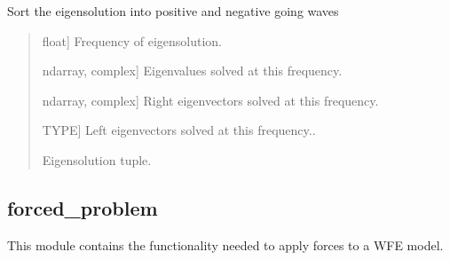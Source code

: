 \documentclass[letterpaper,10pt,english]{sphinxmanual}
\begin{document}
\begin{fulllineitems}
\label{\detokenize{core:pywfe.core.classify_modes.sort_eigensolution}}
\pysigstartsignatures
{}
\pysigstopsignatures
\sphinxAtStartPar
Sort the eigensolution into positive and negative going waves
\begin{quote}\begin{description}
\begin{description}
\sphinxlineitem{\sphinxstylestrong{f}}{[}float{]}
\sphinxAtStartPar
Frequency of eigensolution.

\sphinxlineitem{\sphinxstylestrong{eigenvalues}}{[}ndarray, complex{]}
\sphinxAtStartPar
Eigenvalues solved at this frequency.

\sphinxlineitem{\sphinxstylestrong{right\_eigenvectors}}{[}ndarray, complex{]}
\sphinxAtStartPar
Right eigenvectors solved at this frequency.

\sphinxlineitem{\sphinxstylestrong{left\_eigenvectors}}{[}TYPE{]}
\sphinxAtStartPar
Left eigenvectors solved at this frequency..

\end{description}

\begin{description}
\sphinxAtStartPar
Eigensolution tuple.

\end{description}

\end{description}\end{quote}

\end{fulllineitems}

\label{\detokenize{core:module-pywfe.core.forced_problem}}

\subsection{forced\_problem}
\label{\detokenize{core:forced-problem}}
\sphinxAtStartPar
This module contains the functionality needed to apply forces to a WFE model.
\end{document}
